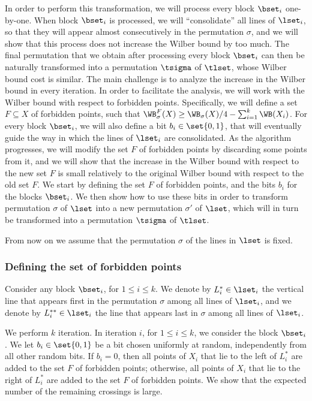 \documentclass[11pt]{article}
\numberwithin{equation}{section}
\theoremstyle{definition}
\theoremstyle{plain}
\begin{document}
In order to perform this transformation, we will process every block $\bset_i$ one-by-one. When block $\bset_i$ is processed, we will ``consolidate'' all lines of $\lset_i$, so that they will appear almost consecutively in the permutation $\sigma$, and we will show that this process does not increase the Wilber bound by too much. The final permutation that we obtain after processing every block $\bset_i$ can then be naturally transformed into a permutation $\tsigma$ of $\tlset$, whose Wilber bound cost is similar. The main challenge is to analyze the increase in the Wilber bound in every iteration. In order to facilitate the analysis, we will work with the Wilber bound with respect to forbidden points. Specifically, we will define a set $F\subseteq X$ of forbidden points, such that $\WB_{\sigma}^F(X)\geq \WB_{\sigma}(X)/4-\sum_{i=1}^k\WB(X_i)$. For every block $\bset_i$, we will also define a bit $b_i\in \set{0,1}$, that will eventually guide the way in which the lines of $\lset_i$ are consolidated. As the algorithm progresses, we will modify the set $F$ of forbidden points by discarding some points from it, and we will show that the increase in the Wilber bound with respect to the new set $F$ is small relatively to the original Wilber bound with respect to the old set $F$. We start by defining the set $F$ of forbidden points, and the bits $b_i$ for the blocks $\bset_i$. We then show how to use these bits in order to transform permutation $\sigma$ of $\lset$ into a new permutation $\sigma'$ of $\lset$, which will in turn be transformed into a permutation $\tsigma$ of $\tlset$.

From now on we assume that the permutation $\sigma$ of the lines in $\lset$ is fixed.

%
%
%
%
\subsubsection{Defining the set  of forbidden points}
%
%
%
%
Consider any block $\bset_i$, for $1\leq i\leq k$. We denote by $L^*_i\in \lset_i$ the vertical line that appears first in the permutation $\sigma$ among all lines of $\lset_i$, and we denote by $L^{**}_i\in \lset_i$ the line that appears last in $\sigma$ among all lines of $\lset_i$. 

We perform $k$ iteration. In iteration $i$, for $1\leq i\leq k$, we consider the block $\bset_i$. We let $b_i\in \set{0,1}$ be a bit chosen uniformly at random, independently from all other random bits. If $b_i=0$, then all points of $X_i$ that lie to the left of $L^*_i$ are added to the set $F$ of forbidden points; otherwise, all points of $X_i$ that lie to the right of $L^*_i$ are added to the set $F$ of forbidden points. We show that the expected number of the remaining crossings is large.
\end{document}
